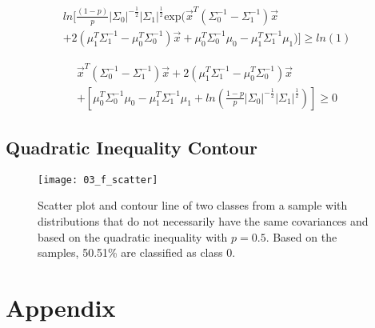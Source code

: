 \documentclass[12pt, a4paper, titlepage, fleqn]{article}
\begin{document}
\begin{multline}
	ln[\frac{(1-p)}{p}|\Sigma_0|^{-\frac{1}{2}}|\Sigma_1|^\frac{1}{2}\text{exp}(\vec{x}^T(\Sigma_0^{-1}-\Sigma_1^{-1})\vec{x}
	\\	
	+2(\mu_1^T\Sigma_1^{-1}-\mu_0^T\Sigma_0^{-1})\vec{x}+\mu_0^T\Sigma_0^{-1}\mu_0-\mu_1^T\Sigma_1^{-1}\mu_1)]
	\geq ln(1)
\end{multline}

\begin{multline}	
	\vec{x}^T(\Sigma_0^{-1}-\Sigma_1^{-1})\vec{x}+2(\mu_1^T\Sigma_1^{-1}-\mu_0^T\Sigma_0^{-1})\vec{x}
	\\	
	+[\mu_0^T\Sigma_0^{-1}\mu_0-\mu_1^T\Sigma_1^{-1}\mu_1+ln(\frac{1-p}{p}|\Sigma_0|^{-\frac{1}{2}}|\Sigma_1|^\frac{1}{2})]
	\geq 0
\end{multline}

\subsection{Quadratic Inequality Contour}

\begin{figure}[h!]
	\centering
	\vspace{-16pt}
	\texttt{[image: 03\_f\_scatter]}
	\caption{Scatter plot and contour line of two classes from a sample with distributions that do not necessarily have the same covariances and based on the quadratic inequality with $p=0.5$. Based on the samples, 50.51\% are classified as class 0.} 
	\label{fig:quadratic contour}
\end{figure}



\section{Appendix}


\end{document}
